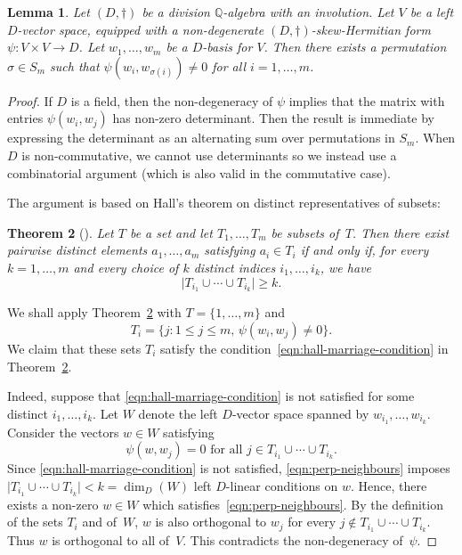 \documentclass[11pt]{article}
\numberwithin{equation}{section}
\newcommand{\bQ}{\mathbb{Q}}
\newcommand{\abs}[1]{\lvert #1 \rvert}
\newtheorem{lemma}{Lemma}[section]
\newtheorem{theorem}[lemma]{Theorem}
\begin{document}
\begin{lemma} \label{non-zero-permutation}
Let $(D,\dag)$ be a division $\bQ$-algebra with an involution.
Let $V$ be a left $D$\nobreakdash-vector space, equipped with a non-degenerate $(D,\dag)$-skew-Hermitian form \hbox{$\psi \colon V \times V \to D$}.
Let $w_1, \dotsc, w_m$ be a $D$-basis for $V$.
Then there exists a permutation $\sigma \in S_m$ such that
$\psi(w_i, w_{\sigma(i)}) \neq 0$
for all $i = 1, \dotsc, m$.
\end{lemma}

\begin{proof}
If $D$ is a field, then the non-degeneracy of $\psi$ implies that the matrix with entries $\psi(w_i,w_j)$ has non-zero determinant.
Then the result is immediate by expressing the determinant as an alternating sum over permutations in $S_m$.
When $D$ is non-commutative, we cannot use determinants so we instead use a combinatorial argument (which is also valid in the commutative case).

The argument is based on Hall's theorem on distinct representatives of subsets:
\begin{theorem}[\cite{Hal35}] \label{hall-marriage-thm}
Let $T$ be a set and let $T_1, \dotsc, T_m$ be subsets of~$T$.
Then there exist pairwise distinct elements $a_1, \dotsc, a_m$ satisfying $a_i \in T_i$ if and only if, for every $k = 1, \dotsc, m$ and every choice of $k$ distinct indices $i_1, \dotsc, i_k$, we have
\begin{equation} \label{eqn:hall-marriage-condition}
\abs{T_{i_1} \cup \dotsb \cup T_{i_k}} \geq k.
\end{equation}
\end{theorem}

We shall apply Theorem~\ref{hall-marriage-thm} with $T = \{ 1, \dotsc, m \}$ and
\[
T_i = \{ j : 1 \leq j \leq m, \, \psi(w_i, w_j) \neq 0 \}.
\]
We claim that these sets $T_i$ satisfy the condition~\eqref{eqn:hall-marriage-condition} in Theorem~\ref{hall-marriage-thm}.

Indeed, suppose that \eqref{eqn:hall-marriage-condition} is not satisfied for some distinct $i_1, \dotsc, i_k$.
Let $W$ denote the left $D$-vector space spanned by $w_{i_1}, \dotsc, w_{i_k}$.
Consider the vectors $w \in W$ satisfying
\begin{equation} \label{eqn:perp-neighbours}
\psi(w, w_j) = 0 \text{ for all } j \in T_{i_1} \cup \dotsb \cup T_{i_k}.
\end{equation}
Since \eqref{eqn:hall-marriage-condition} is not satisfied, \eqref{eqn:perp-neighbours} imposes $\abs{T_{i_1} \cup \dotsb \cup T_{i_k}} < k = \dim_D(W)$ left $D$-linear conditions on $w$.
Hence, there exists a non-zero $w \in W$ which satisfies~\eqref{eqn:perp-neighbours}.
By the definition of the sets $T_i$ and of~$W$, $w$ is also orthogonal to $w_j$ for every $j \not\in T_{i_1} \cup \dotsb \cup T_{i_k}$.
Thus $w$ is orthogonal to all of~$V$. This contradicts the non-degeneracy of~$\psi$.


\end{proof}
\end{document}
